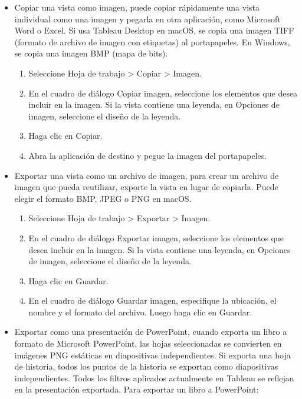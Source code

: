 \documentclass[
]{book}
\providecommand{\tightlist}{%
  \setlength{\itemsep}{0pt}\setlength{\parskip}{0pt}}
\begin{document}
\begin{itemize}
\tightlist
\item
  Copiar una vista como imagen, puede copiar rápidamente una vista individual como una imagen y pegarla en otra aplicación, como Microsoft Word o Excel. Si usa Tableau Desktop en macOS, se copia una imagen TIFF (formato de archivo de imagen con etiquetas) al portapapeles. En Windows, se copia una imagen BMP (mapa de bits).

  \begin{enumerate}
  \def\labelenumi{\arabic{enumi}.}
  \tightlist
  \item
    Seleccione Hoja de trabajo \textgreater{} Copiar \textgreater{} Imagen.
  \item
    En el cuadro de diálogo Copiar imagen, seleccione los elementos que desea incluir en la imagen. Si la vista contiene una leyenda, en Opciones de imagen, seleccione el diseño de la leyenda.
  \item
    Haga clic en Copiar.
  \item
    Abra la aplicación de destino y pegue la imagen del portapapeles.
  \end{enumerate}
\item
  Exportar una vista como un archivo de imagen, para crear un archivo de imagen que pueda reutilizar, exporte la vista en lugar de copiarla. Puede elegir el formato BMP, JPEG o PNG en macOS.

  \begin{enumerate}
  \def\labelenumi{\arabic{enumi}.}
  \tightlist
  \item
    Seleccione Hoja de trabajo \textgreater{} Exportar \textgreater{} Imagen.
  \item
    En el cuadro de diálogo Exportar imagen, seleccione los elementos que desea incluir en la imagen. Si la vista contiene una leyenda, en Opciones de imagen, seleccione el diseño de la leyenda.
  \item
    Haga clic en Guardar.
  \item
    En el cuadro de diálogo Guardar imagen, especifique la ubicación, el nombre y el formato del archivo. Luego haga clic en Guardar.
  \end{enumerate}
\item
  Exportar como una presentación de PowerPoint, cuando exporta un libro a formato de Microsoft PowerPoint, las hojas seleccionadas se convierten en imágenes PNG estáticas en diapositivas independientes. Si exporta una hoja de historia, todos los puntos de la historia se exportan como diapositivas independientes. Todos los filtros aplicados actualmente en Tableau se reflejan en la presentación exportada. Para exportar un libro a PowerPoint:


\end{itemize}
\end{document}
